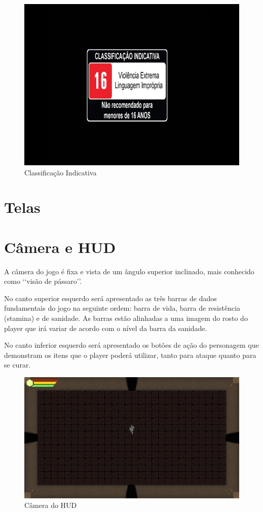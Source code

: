 \documentclass{article}
\begin{document}
\begin{figure}[!h]
    \centering
    \caption{Classificação Indicativa}
    \includegraphics[keepaspectratio=true,scale=0.30]{images/classificacao_indicativa.png}
\end{figure}

\section{Telas}

\section{Câmera e HUD}
A câmera do jogo é fixa e vista de um ângulo superior inclinado, mais conhecido como \lq\lq visão de pássaro\rq\rq. 

No canto superior esquerdo será apresentado as três barras de dados fundamentais do jogo na seguinte ordem: barra de vida, barra de resistência (stamina) e de sanidade. As barras estão alinhadas a uma imagem do rosto do player que irá variar de acordo com o nível da barra da sanidade.

No canto inferior esquerdo será apresentado os botões de ação do personagem que demonstram os itens que o player poderá utilizar, tanto para ataque quanto para se curar.

\begin{figure}[!h]
    \centering
    \caption{Câmera do HUD}
    \includegraphics[keepaspectratio=true,scale=0.35]{images/HUD.jpg}
\end{figure}
\end{document}
